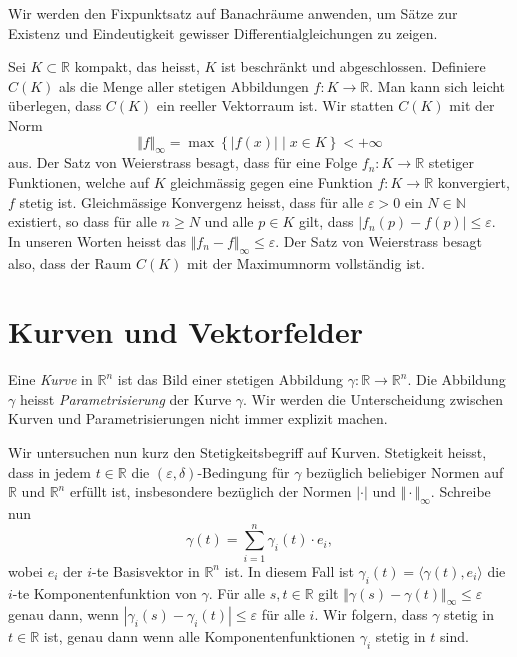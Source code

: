 \documentclass[../main.tex]{subfiles}
\begin{document}
Wir werden den Fixpunktsatz auf Banachräume
anwenden, um Sätze zur Existenz und Eindeutigkeit
gewisser Differentialgleichungen zu zeigen.

\begin{example}
  Sei $K \subset \mathbb{R}$ kompakt,
  das heisst, $K$ ist beschränkt und abgeschlossen.
  Definiere $C(K)$ als die Menge aller stetigen
  Abbildungen  $f \colon K \to \mathbb{R}$.
  Man kann sich leicht überlegen,
  dass $C(K)$ ein reeller Vektorraum ist.
  Wir statten $C(K)$ mit der Norm
  \[
    \Vert f \Vert_{\infty} =
    \max \left\{|f(x)| \mid x \in K\right\} < +\infty
  \]
  aus. Der Satz von Weierstrass besagt,
  dass für eine Folge $f_n \colon K \to \mathbb{R}$ 
  stetiger Funktionen, welche auf $K$ 
  gleichmässig gegen eine Funktion $f \colon K \to \mathbb{R}$
  konvergiert, $f$ stetig ist.
  Gleichmässige Konvergenz heisst,
  dass für alle $\varepsilon > 0$ 
  ein $N \in \mathbb{N}$ existiert, so dass
  für alle $n \geq N$ und alle $p \in K$ gilt,
  dass $|f_n(p) - f(p)| \leq \varepsilon$.
  In unseren Worten heisst das
  $\Vert f_n - f \Vert_{\infty} \leq \varepsilon$.
  Der Satz von Weierstrass besagt also,
  dass der Raum $C(K)$ mit der Maximumnorm vollständig ist.
\end{example}

\section{Kurven und Vektorfelder}
\begin{definition}
  Eine \emph{Kurve} in $\mathbb{R}^n$ 
  ist das Bild einer stetigen Abbildung
  $\gamma \colon \mathbb{R} \to \mathbb{R}^n$.
  Die Abbildung $\gamma$ heisst
  \emph{Parametrisierung} der Kurve $\gamma$.
  Wir werden die Unterscheidung zwischen Kurven
  und Parametrisierungen nicht immer explizit
  machen.
\end{definition}

Wir untersuchen nun kurz den Stetigkeitsbegriff auf Kurven.
Stetigkeit heisst, dass in jedem $t \in \mathbb{R}$ die
$(\varepsilon, \delta)$-Bedingung für $\gamma$ 
bezüglich beliebiger Normen auf $\mathbb{R}$ und $\mathbb{R}^n$ 
erfüllt ist, insbesondere
bezüglich der Normen $| \cdot |$ und $\Vert \cdot \Vert_{\infty}$.
Schreibe nun 
\[
  \gamma(t) = \sum_{i=1}^{n} \gamma_i(t) \cdot e_i,
\]
wobei $e_i$ der $i$-te Basisvektor in $\mathbb{R}^n$ ist.
In diesem Fall ist $\gamma_i(t) = \langle \gamma(t), e_i \rangle$  %
die $i$-te Komponentenfunktion von $\gamma$.
Für alle $s, t \in \mathbb{R}$ gilt
$\Vert \gamma(s) - \gamma(t) \Vert_\infty \leq \varepsilon$ 
genau dann, wenn $|\gamma_i(s) - \gamma_i(t)| \leq \varepsilon$
für alle  $i$.
Wir folgern, dass $\gamma$ stetig in $t \in \mathbb{R}$ 
ist, genau dann wenn alle Komponentenfunktionen
$\gamma_i$ stetig in $t$ sind.
\end{document}
